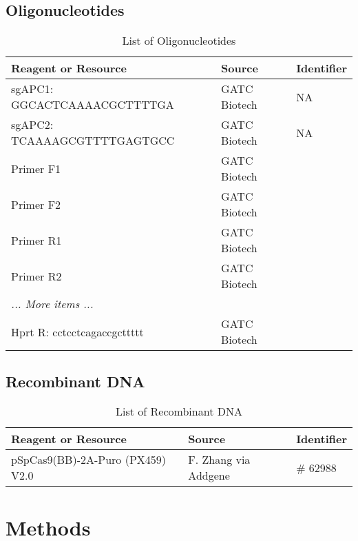 \begin{flushleft}

\subsection*{Oligonucleotides}
\begin{table}[htb]
\caption{List of Oligonucleotides}
\label{tab:oligonucleotides} %
\begin{tabularx}{\textwidth}{Xll}
\toprule
\textbf{Reagent or Resource} & \textbf{Source} & \textbf{Identifier} \\
\midrule
sgAPC1: GGCACTCAAAACGCTTTTGA & GATC Biotech & NA \\
sgAPC2: TCAAAAGCGTTTTGAGTGCC & GATC Biotech & NA \\
Primer F1 & GATC Biotech &  \\
Primer F2 & GATC Biotech &  \\
Primer R1 & GATC Biotech &  \\
Primer R2 & GATC Biotech &  \\
\textit{... More items ...} \\
Hprt R: cctcctcagaccgcttttt & GATC Biotech &  \\
\bottomrule
\end{tabularx}
\end{table}

\subsection*{Recombinant DNA}
\begin{table}[htb]
\caption{List of Recombinant DNA}
\label{tab:recombinant_dna} %
\begin{tabularx}{\textwidth}{Xll}
\toprule
\textbf{Reagent or Resource} & \textbf{Source} & \textbf{Identifier} \\
\midrule
pSpCas9(BB)-2A-Puro (PX459) V2.0 & F. Zhang via Addgene & \# 62988 \\
\bottomrule
\end{tabularx}
\end{table}

\section{Methods}


\end{flushleft}
